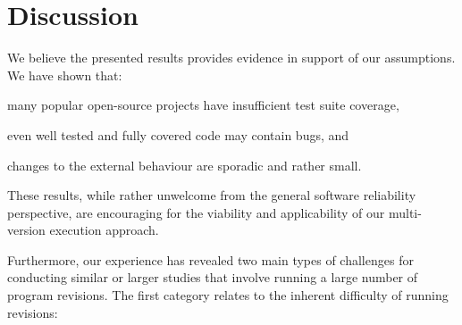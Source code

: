 \section{Discussion}
\label{evolution:discussion}

We believe the presented results provides evidence in support of our
assumptions. We have shown that:%
\begin{inparaenum}[(1)]
\item many popular open-source projects have insufficient test suite coverage,
\item even well tested and fully covered code may contain bugs, and
\item changes to the external behaviour are sporadic and rather small.
\end{inparaenum}
These results, while rather unwelcome from the general software reliability
perspective, are encouraging for the viability and applicability of our
multi-version execution approach.


Furthermore, our experience has revealed two main types of challenges for
conducting similar or larger studies that involve running a large number of
program revisions. The first category relates to the inherent difficulty of
running revisions:

